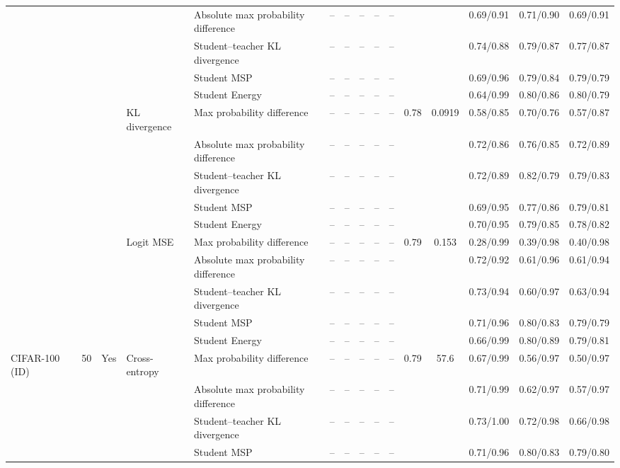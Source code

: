 \documentclass[border=2pt]{standalone}
\begin{document}
\begin{tabular}{lllllcccccccccc}
 &  &  &  & Absolute max probability difference & -- & -- & -- & -- & -- &  &  & 0.69/0.91 & 0.71/0.90 & 0.69/0.91 \\
 &  &  &  & Student--teacher KL divergence & -- & -- & -- & -- & -- &  &  & 0.74/0.88 & 0.79/0.87 & 0.77/0.87 \\
 &  &  &  & Student MSP & -- & -- & -- & -- & -- &  &  & 0.69/0.96 & 0.79/0.84 & 0.79/0.79 \\
 &  &  &  & Student Energy & -- & -- & -- & -- & -- &  &  & 0.64/0.99 & 0.80/0.86 & 0.80/0.79 \\
 &  &  & KL divergence & Max probability difference & -- & -- & -- & -- & -- & 0.78 & 0.0919 & 0.58/0.85 & 0.70/0.76 & 0.57/0.87 \\
 &  &  &  & Absolute max probability difference & -- & -- & -- & -- & -- &  &  & 0.72/0.86 & 0.76/0.85 & 0.72/0.89 \\
 &  &  &  & Student--teacher KL divergence & -- & -- & -- & -- & -- &  &  & 0.72/0.89 & 0.82/0.79 & 0.79/0.83 \\
 &  &  &  & Student MSP & -- & -- & -- & -- & -- &  &  & 0.69/0.95 & 0.77/0.86 & 0.79/0.81 \\
 &  &  &  & Student Energy & -- & -- & -- & -- & -- &  &  & 0.70/0.95 & 0.79/0.85 & 0.78/0.82 \\
 &  &  & Logit MSE & Max probability difference & -- & -- & -- & -- & -- & 0.79 & 0.153 & 0.28/0.99 & 0.39/0.98 & 0.40/0.98 \\
 &  &  &  & Absolute max probability difference & -- & -- & -- & -- & -- &  &  & 0.72/0.92 & 0.61/0.96 & 0.61/0.94 \\
 &  &  &  & Student--teacher KL divergence & -- & -- & -- & -- & -- &  &  & 0.73/0.94 & 0.60/0.97 & 0.63/0.94 \\
 &  &  &  & Student MSP & -- & -- & -- & -- & -- &  &  & 0.71/0.96 & 0.80/0.83 & 0.79/0.79 \\
 &  &  &  & Student Energy & -- & -- & -- & -- & -- &  &  & 0.66/0.99 & 0.80/0.89 & 0.79/0.81 \\
\addlinespace
CIFAR-100 (ID) & 50 & Yes & Cross-entropy & Max probability difference & -- & -- & -- & -- & -- & 0.79 & 57.6 & 0.67/0.99 & 0.56/0.97 & 0.50/0.97 \\
 &  &  &  & Absolute max probability difference & -- & -- & -- & -- & -- &  &  & 0.71/0.99 & 0.62/0.97 & 0.57/0.97 \\
 &  &  &  & Student--teacher KL divergence & -- & -- & -- & -- & -- &  &  & 0.73/1.00 & 0.72/0.98 & 0.66/0.98 \\
 &  &  &  & Student MSP & -- & -- & -- & -- & -- &  &  & 0.71/0.96 & 0.80/0.83 & 0.79/0.80 \\

\end{tabular}
\end{document}
